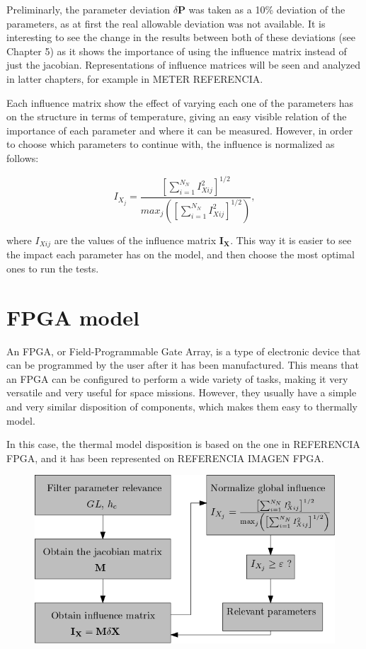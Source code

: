 Preliminarly,  the parameter deviation $ \delta \boldsymbol{P}$ was taken as a 10\% deviation of the parameters, as at first the real allowable deviation was not available. It is interesting to see the change in the results between both of these deviations (see Chapter 5) as it shows the importance of using the influence matrix instead of just the jacobian. Representations of influence matrices will be seen and analyzed in latter chapters, for example in METER REFERENCIA.

Each influence matrix show the effect of varying each one of the parameters has on the structure in terms of temperature, giving an easy visible relation of the importance of each parameter and where it can be measured. However, in order to choose which parameters to continue with, the influence is normalized as follows:


\begin{equation}I_{X_j}=\frac{\left[\sum_{i=1}^{N_N}I_{Xij}^2\right]^{1/2}}{max_j\left(\left[\sum_{i=1}^{N_N}I_{Xij}^2\right]^{1/2}\right)},\end{equation}

where $I_{Xij}$ are the values of the influence matrix $\boldsymbol{I_X}$. This way it is easier to see the impact each parameter has on the model, and then choose the most optimal ones to run the tests.


\section{FPGA model}

An FPGA, or Field-Programmable Gate Array, is a type of electronic device that can be programmed by the user after it has been manufactured. This means that an FPGA can be configured to perform a wide variety of tasks, making it very versatile and very useful for space missions. However, they usually have a simple and very similar disposition of components, which makes them easy to thermally model.

In this case, the thermal model disposition is based on the one in REFERENCIA FPGA, and it has been represented on REFERENCIA IMAGEN FPGA. 

\begin{figure}[H]
    \centering
    \includegraphics[scale=0.5]{Figures/influence_diagram.png}
    \caption{}
    \label{fig:1}
\end{figure}

